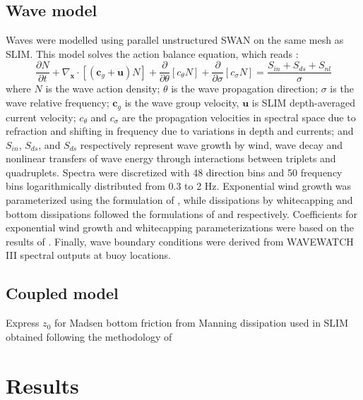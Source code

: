 \documentclass[11pt,a4paper]{article}
\begin{document}
\subsection{Wave model}
Waves were modelled using parallel unstructured SWAN \citep{booij1999third} on the same mesh as SLIM. This model solves the action balance equation, which reads \citep{mei1989applied}:
\begin{equation}
    \dfrac{\partial N}{\partial t} + \nabla_\mathbf{x}\cdot[(\mathbf{c}_g+\mathbf{u})N] + \dfrac{\partial }{\partial \theta}[c_\theta N] + \dfrac{\partial}{\partial \sigma}[c_\sigma N] = \dfrac{S_{in}+S_{ds}+S_{nl}}{\sigma}
\end{equation}
where $N$ is the wave action density; $\theta$ is the wave propagation direction; $\sigma$ is the wave relative frequency; $\mathbf{c}_g$ is the wave group velocity, $\mathbf{u}$ is SLIM depth-averaged current velocity; $c_\theta$ and $c_\sigma$ are the propagation velocities in spectral space due to refraction and shifting in frequency due to variations in depth and currents; and $S_{in}$, $S_{ds}$, and $S_{ds}$ respectively represent wave growth by wind, wave decay and nonlinear transfers of wave energy through interactions between triplets and quadruplets. Spectra were discretized with 48 direction bins and 50 frequency bins logarithmically distributed from 0.3 to 2 Hz. Exponential wind growth was parameterized using the formulation of \cite{janssen1991quasi}, while dissipations by whitecapping and bottom dissipations followed the formulations of \cite{komen1984existence} and \cite{madsen1989spectral} respectively. Coefficients for exponential wind growth and whitecapping parameterizations were based on the results of \cite{siadatmousavi2011evaluation}. Finally, wave boundary conditions were derived from WAVEWATCH III \citep{tolman2009user} spectral outputs at buoy locations.
\subsection{Coupled model}
Express $z_0$ for Madsen bottom friction from Manning dissipation used in SLIM obtained following the methodology of \cite{dietrich2011hurricane}

\section{Results}
\end{document}
